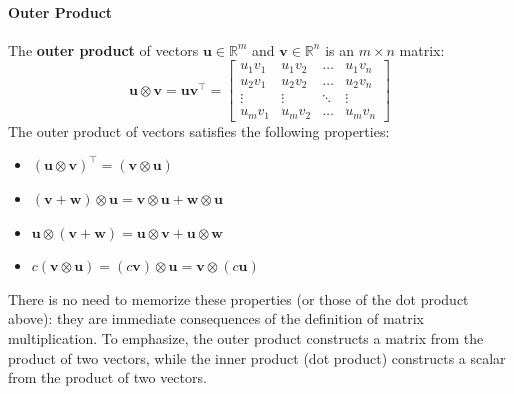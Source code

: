   

\paragraph*{Outer Product}
The \textbf{outer product} of vectors $ \mathbf{u} \in \mathbb{R}^m $ and $ \mathbf{v} \in \mathbb{R}^n $ is an $ m \times n $ matrix:
\begin{equation*}
    \mathbf{u}\otimes\mathbf{v} = \mathbf{u} \mathbf{v}^\top = \begin{bmatrix} u_1 v_1 & u_1 v_2 & \ldots & u_1 v_n \\ u_2 v_1 & u_2 v_2 & \ldots & u_2 v_n \\ \vdots & \vdots & \ddots & \vdots \\ u_m v_1 & u_m v_2 & \ldots & u_m v_n \end{bmatrix}
\end{equation*}
The outer product of vectors satisfies the following properties:
\begin{itemize}
    \item $ (\mathbf{u} \otimes \mathbf{v})^\top = (\mathbf{v} \otimes \mathbf{u}) $
    \item $ (\mathbf{v} + \mathbf{w}) \otimes \mathbf{u} = \mathbf{v} \otimes \mathbf{u} + \mathbf{w} \otimes \mathbf{u} $
    \item $ \mathbf{u} \otimes (\mathbf{v} + \mathbf{w}) = \mathbf{u} \otimes \mathbf{v} + \mathbf{u} \otimes \mathbf{w} $
    \item $ c (\mathbf{v} \otimes \mathbf{u}) = (c \mathbf{v}) \otimes \mathbf{u} = \mathbf{v} \otimes (c \mathbf{u}) $
\end{itemize}
There is no need to memorize these properties (or those of the dot product above): they are immediate consequences of the definition of matrix multiplication.
To emphasize, the outer product constructs a matrix from the product of two vectors, while the inner product (dot product) constructs a scalar from the product of two vectors.

